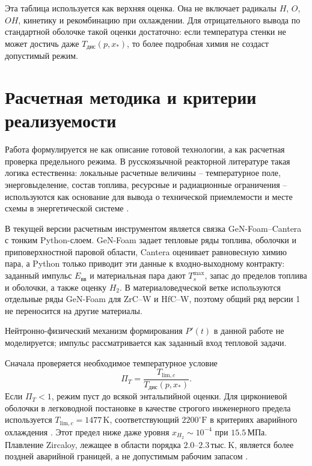 \documentclass[12pt]{article}
\begin{document}
Эта таблица используется как верхняя оценка. Она не включает радикалы \(H\), \(O\), \(OH\), кинетику и рекомбинацию при охлаждении. Для отрицательного вывода по стандартной оболочке такой оценки достаточно: если температура стенки не может достичь даже \(T_{\mathrm{дис}}(p,x_*)\), то более подробная химия не создаст допустимый режим.

\section{Расчетная методика и критерии реализуемости}

Работа формулируется не как описание готовой технологии, а как расчетная проверка предельного режима. В русскоязычной реакторной литературе такая логика естественна: локальные расчетные величины -- температурное поле, энерговыделение, состав топлива, ресурсные и радиационные ограничения -- используются как основание для вывода о технической приемлемости и месте схемы в энергетической системе \cite{CibulskyEnergySecurity2006,DESAE2008,CibulskyTempCoeff2014,CibulskyStrategy2022}.

В текущей версии расчетным инструментом является связка GeN-Foam--Cantera с тонким Python-слоем. GeN-Foam задает тепловые ряды топлива, оболочки и приповерхностной паровой области, Cantera оценивает равновесную химию пара, а Python только приводит эти данные к входно-выходному контракту: заданный импульс \(E_{\mathrm{вв}}\) и материальная пара дают \(T_s^{\max}\), запас до пределов топлива и оболочки, а также оценку \(H_2\). В материаловедческой ветке используются отдельные ряды GeN-Foam для \(\mathrm{ZrC}\)--W и \(\mathrm{HfC}\)--W, поэтому общий ряд версии 1 не переносится на другие материалы.

Нейтронно-физический механизм формирования \(P'(t)\) в данной работе не моделируется; импульс рассматривается как заданный вход тепловой задачи.

Сначала проверяется необходимое температурное условие
\[
\Pi_T=\frac{T_{\mathrm{lim},c}}{T_{\mathrm{дис}}(p,x_*)}.
\]
Если \(\Pi_T<1\), режим пуст до всякой энтальпийной оценки. Для циркониевой оболочки в легководной постановке в качестве строгого инженерного предела используется \(T_{\mathrm{lim},c}=1477\,\mathrm{K}\), соответствующий \(2200^\circ\mathrm{F}\) в критериях аварийного охлаждения \cite{NRC10CFR5046}. Этот предел ниже даже уровня \(x_{H_2}\sim10^{-4}\) при \(15.5\,\mathrm{МПа}\). Плавление Zircaloy, лежащее в области порядка \(2.0\)--\(2.3\,\mathrm{тыс.\ K}\), является более поздней аварийной границей, а не допустимым рабочим запасом \cite{MassihZrPhase2021}.
\end{document}
